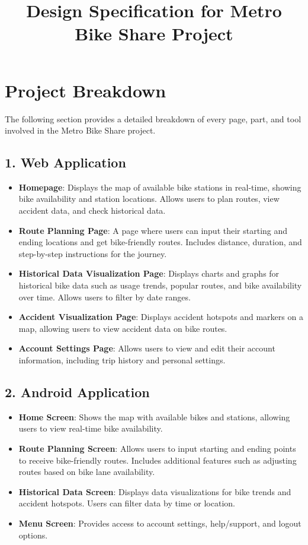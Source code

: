 \documentclass[12pt]{article}
\title{Design Specification for Metro Bike Share Project}
\author{}
\date{}
\begin{document}
\maketitle

\section*{Project Breakdown}
The following section provides a detailed breakdown of every page, part, and tool involved in the Metro Bike Share project.

\subsection*{1. Web Application}
\begin{itemize}
    \item \textbf{Homepage}: Displays the map of available bike stations in real-time, showing bike availability and station locations. Allows users to plan routes, view accident data, and check historical data.
    \item \textbf{Route Planning Page}: A page where users can input their starting and ending locations and get bike-friendly routes. Includes distance, duration, and step-by-step instructions for the journey.
    \item \textbf{Historical Data Visualization Page}: Displays charts and graphs for historical bike data such as usage trends, popular routes, and bike availability over time. Allows users to filter by date ranges.
    \item \textbf{Accident Visualization Page}: Displays accident hotspots and markers on a map, allowing users to view accident data on bike routes.
    \item \textbf{Account Settings Page}: Allows users to view and edit their account information, including trip history and personal settings.
\end{itemize}

\subsection*{2. Android Application}
\begin{itemize}
    \item \textbf{Home Screen}: Shows the map with available bikes and stations, allowing users to view real-time bike availability.
    \item \textbf{Route Planning Screen}: Allows users to input starting and ending points to receive bike-friendly routes. Includes additional features such as adjusting routes based on bike lane availability.
    \item \textbf{Historical Data Screen}: Displays data visualizations for bike trends and accident hotspots. Users can filter data by time or location.
    \item \textbf{Menu Screen}: Provides access to account settings, help/support, and logout options.
\end{itemize}
\end{document}
